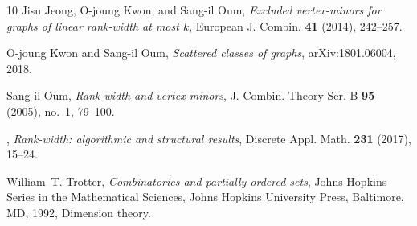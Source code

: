 \documentclass[11pt]{article}
\begin{document}
\begin{thebibliography}{10}
Jisu Jeong, O{-}joung Kwon, and Sang{-}il Oum, \emph{Excluded vertex-minors for
  graphs of linear rank-width at most {$k$}}, European J. Combin. \textbf{41}
  (2014), 242--257. 

O{-}joung Kwon and Sang{-}il Oum, \emph{Scattered classes of graphs},
  arXiv:1801.06004, 2018.

Sang{-}il Oum, \emph{Rank-width and vertex-minors}, J. Combin. Theory Ser. B
  \textbf{95} (2005), no.~1, 79--100. 

\bysame, \emph{Rank-width: algorithmic and structural results}, Discrete Appl.
  Math. \textbf{231} (2017), 15--24.

William~T. Trotter, \emph{Combinatorics and partially ordered sets}, Johns
  Hopkins Series in the Mathematical Sciences, Johns Hopkins University Press,
  Baltimore, MD, 1992, Dimension theory. 

\end{thebibliography}
\end{document}
